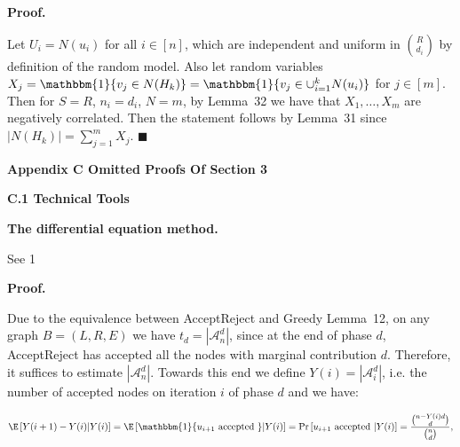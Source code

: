\documentclass[10pt,a4paper]{article}
\begin{document}
\par\medskip\noindent\textbf{Proof.}\par



Let $U_{i}=N(u_{i})$ for all $i\in[n]$, which are independent and uniform in $\binom{R}{d_{i}}$ by definition of the random model.
Also let random variables $X_{j}=\mathbbm{1}\{v_{j}\in N(H_{k})\}=\mathbbm{1}\{v_{j}\in\cup_{i=1}^{k}N(u_{i})\}$ for $j\in[m]$.
Then for $S=R$, $n_{i}=d_{i}$, $N=m$, by Lemma 32 we have that $X_{1},\dots,X_{m}$ are negatively correlated.
Then the statement follows by Lemma 31 since $|N(H_{k})|=\sum_{j=1}^{m}X_{j}$.
\ensuremath{\blacksquare}\par








\par\medskip\noindent\textbf{Appendix C Omitted Proofs Of Section 3}\par




\par\medskip\noindent\textbf{C.1 Technical Tools}\par




\par\medskip\noindent\textbf{The differential equation method.}\par




See 1\par




\par\medskip\noindent\textbf{Proof.}\par



Due to the equivalence between AcceptReject and Greedy Lemma 12, on any graph $B=(L,R,E)$ we have $t_{d}=|\mathcal{A}^{d}_{n}|$, since at the end of phase $d$, AcceptReject has accepted all the nodes with marginal contribution $d$. Therefore, it suffices to estimate $|\mathcal{A}^{d}_{n}|$. Towards this end we define $Y(i)=|\mathcal{A}^{d}_{i}|$, i.e. the number of accepted nodes on iteration $i$ of phase $d$ and we have:\par


\[\begin{gathered}
\displaystyle\E\left[Y(i+1)-Y(i)\middle|Y(i)\right]=\E\left[\mathbbm{1}\{u_{i+1}\text{ accepted }\}\middle|Y(i)\right]=\Pr\left[u_{i+1}\text{ accepted }\middle|Y(i)\right]=\frac{\binom{n-Y(i)d}{d}}{\binom{n}{d}},
\end{gathered}\]
\end{document}

